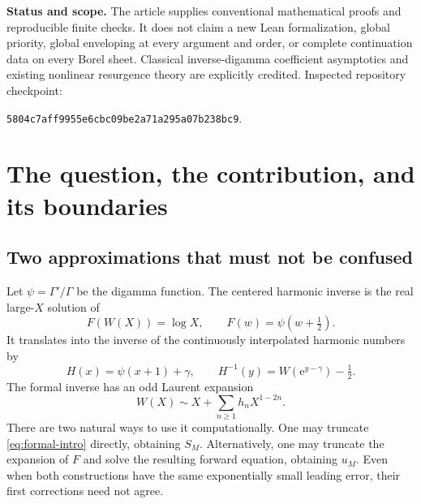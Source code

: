 \documentclass[11pt,a4paper]{article}
\theoremstyle{definition}
\numberwithin{equation}{section}
\newcommand{\ee}{\mathrm{e}}
\begin{document}
\begin{titlepage}
\begin{abstract}
\end{abstract}
\vspace{3mm}
\noindent\textbf{Status and scope.} The article supplies conventional mathematical proofs and reproducible finite checks. It does not claim a new Lean formalization, global priority, global enveloping at every argument and order, or complete continuation data on every Borel sheet. Classical inverse-digamma coefficient asymptotics and existing nonlinear resurgence theory are explicitly credited.
\vfill
\noindent\small Inspected repository checkpoint:\par
\noindent\small\texttt{5804c7aff9955e6cbc09be2a71a295a07b238bc9}.\par
\end{titlepage}
\hypersetup{pageanchor=true}
\begingroup\small\setlength{\parskip}{0pt}\tableofcontents\endgroup
\newpage

\section{The question, the contribution, and its boundaries}
\label{sec:intro}

\subsection{Two approximations that must not be confused}
Let $\psi=\Gamma'/\Gamma$ be the digamma function. The centered harmonic inverse is the real large-$X$ solution of
\begin{equation}
 F(W(X))=\log X,\qquad F(w)=\psi(w+\tfrac12).
 \label{eq:normalization}
\end{equation}
It translates into the inverse of the continuously interpolated harmonic numbers by
\begin{equation}
 H(x)=\psi(x+1)+\gamma,\qquad
 H^{-1}(y)=W(\ee^{y-\gamma})-\tfrac12.
 \label{eq:harmonic}
\end{equation}
The formal inverse has an odd Laurent expansion
\begin{equation}
 W(X)\sim X+\sum_{n\ge1}h_nX^{1-2n}.
 \label{eq:formal-intro}
\end{equation}
There are two natural ways to use it computationally. One may truncate \eqref{eq:formal-intro} directly, obtaining $S_M$. Alternatively, one may truncate the expansion of $F$ and solve the resulting forward equation, obtaining $u_M$. Even when both constructions have the same exponentially small leading error, their first corrections need not agree.
\end{document}
